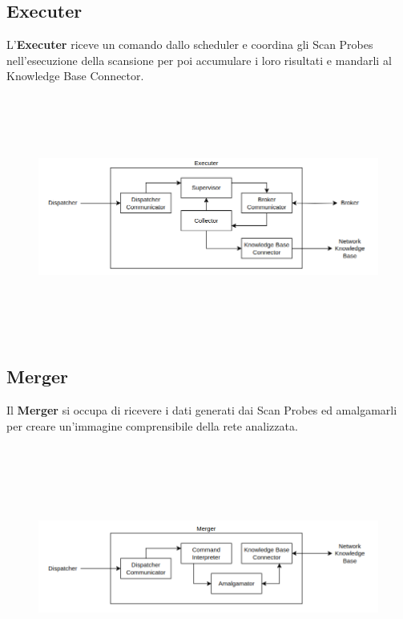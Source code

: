 \documentclass[target=bach,aauheader=,style=]{thud}
\begin{document}
\FloatBarrier

\subsection{Executer} 
L'\textbf{Executer} riceve un comando dallo scheduler e coordina gli Scan Probes nell'esecuzione della scansione per poi accumulare i loro risultati e mandarli al Knowledge Base Connector.

\begin{figure}[h]
  \includegraphics[width=14cm, height=8cm]{executer}
  \centering
\end{figure}

\FloatBarrier

\newpage

\subsection{Merger}
Il \textbf{Merger} si occupa di ricevere i dati generati dai Scan Probes ed amalgamarli per creare un'immagine comprensibile della rete analizzata. 


\begin{figure}[h]
  \includegraphics[width=14cm, height=8cm]{merger}
  \centering
\end{figure}
\end{document}

